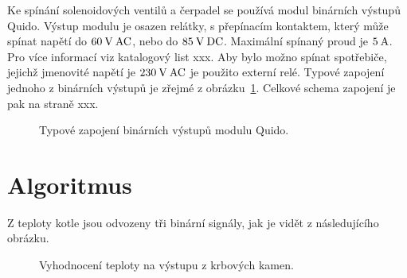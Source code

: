 \documentclass[a4paper,draft]{book}
\begin{document}
        Ke spínání solenoidových ventilů a čerpadel se používá modul binárních
        výstupů Quido. Výstup modulu je
        osazen relátky, s přepínacím kontaktem, který může spínat napětí do
        $60\rm\:V\:AC$, nebo do $85\rm\:V\:DC$. Maximální spínaný proud je
        $5\rm\:A$. Pro více informací viz katalogový list xxx. Aby bylo možno
        spínat spotřebiče, jejichž jmenovité napětí je $230\rm\:V\:AC$ je
        použito externí relé. Typové zapojení jednoho z binárních výstupů je
        zřejmé z obrázku~\ref{fig:binary-out}. Celkové schema zapojení je pak
        na straně xxx.

        \begin{figure}\centering
            \begin{tikzpicture}
                
            \end{tikzpicture}
            \caption{Typové zapojení binárních výstupů modulu Quido.}
            \label{fig:binary-out}
        \end{figure}

        \cite{da2rs}

    \chapter{Algoritmus}

        Z teploty kotle jsou odvozeny tři binární signály, jak je vidět z
        následujícího obrázku.

        \begin{figure}
            \begin{tikzpicture}
                
            \end{tikzpicture}
            \caption{Vyhodnocení teploty na výstupu z krbových kamen.}
        \end{figure}

\appendix

\backmatter

\printindex


\end{document}
